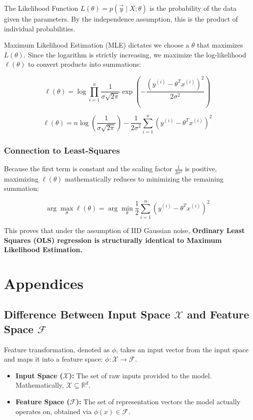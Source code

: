 \documentclass[12pt, a4paper]{report}
\begin{document}
The Likelihood Function $L(\theta) = p(\vec{y} \mid X; \theta)$ is the probability of the data given the parameters. By the independence assumption, this is the product of individual probabilities.

Maximum Likelihood Estimation (MLE) dictates we choose a $\theta$ that maximizes $L(\theta)$. Since the logarithm is strictly increasing, we maximize the log-likelihood $\ell(\theta)$ to convert products into summations:

\[ \ell(\theta) = \log \prod_{i=1}^n \frac{1}{\sigma\sqrt{2\pi}} \exp\left( -\frac{(y^{(i)} - \theta^T x^{(i)})^2}{2\sigma^2} \right) \]

\[ \ell(\theta) = n \log \left(\frac{1}{\sigma\sqrt{2\pi}}\right) - \frac{1}{2\sigma^2} \sum_{i=1}^n (y^{(i)} - \theta^T x^{(i)})^2 \]

\subsection{Connection to Least-Squares}

Because the first term is constant and the scaling factor $\frac{1}{2\sigma^2}$ is positive, maximizing $\ell(\theta)$ mathematically reduces to minimizing the remaining summation:

\[ \arg\max_\theta \ell(\theta) = \arg\min_\theta \frac{1}{2} \sum_{i=1}^n (y^{(i)} - \theta^T x^{(i)})^2 \]

This proves that under the assumption of IID Gaussian noise, \textbf{Ordinary Least Squares (OLS) regression is structurally identical to Maximum Likelihood Estimation.}

\appendix
\chapter{Appendices}

\section{Difference Between Input Space $\mathcal{X}$ and Feature Space $\mathcal{F}$}

Feature transformation, denoted as $\phi$, takes an input vector from the input space and maps it into a feature space: $\phi: \mathcal{X} \to \mathcal{F}$.

\begin{itemize}
    \item \textbf{Input Space ($\mathcal{X}$):} The set of raw inputs provided to the model. Mathematically, $\mathcal{X} \subseteq \mathbb{R}^d$.
    \item \textbf{Feature Space ($\mathcal{F}$):} The set of representation vectors the model actually operates on, obtained via $\phi(x) \in \mathcal{F}$.
\end{itemize}
\end{document}
